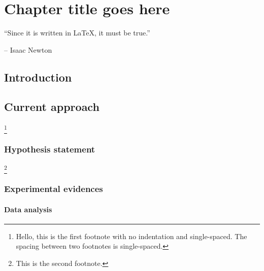 \chapter{Chapter title goes here} \label{chap:chap-3}



\epigraph{\enquote{Since it is written in \LaTeX, it must be true.}}{-- Isaac Newton}




\section{Introduction}
\blindtext 


\section{Current approach}
\blindtext\footnote{Hello, this is the first footnote with no indentation and single-spaced. The spacing between two footnotes is single-spaced.}

\subsection{Hypothesis statement}
\blindtext\footnote{This is the second footnote.}


\subsection{Experimental evidences}
\blindtext


\subsubsection{Data analysis}
\blindtext